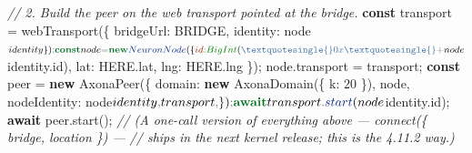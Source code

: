 \documentclass[
  nobib]{tufte-handout}
\newenvironment{Shaded}{}{}
\newcommand{\AttributeTok}[1]{\textcolor[rgb]{0.49,0.56,0.16}{#1}}
\newcommand{\BuiltInTok}[1]{\textcolor[rgb]{0.00,0.50,0.00}{#1}}
\newcommand{\CommentTok}[1]{\textcolor[rgb]{0.38,0.63,0.69}{\textit{#1}}}
\newcommand{\ControlFlowTok}[1]{\textcolor[rgb]{0.00,0.44,0.13}{\textbf{#1}}}
\newcommand{\DataTypeTok}[1]{\textcolor[rgb]{0.56,0.13,0.00}{#1}}
\newcommand{\DecValTok}[1]{\textcolor[rgb]{0.25,0.63,0.44}{#1}}
\newcommand{\FunctionTok}[1]{\textcolor[rgb]{0.02,0.16,0.49}{#1}}
\newcommand{\KeywordTok}[1]{\textcolor[rgb]{0.00,0.44,0.13}{\textbf{#1}}}
\newcommand{\NormalTok}[1]{#1}
\newcommand{\OperatorTok}[1]{\textcolor[rgb]{0.40,0.40,0.40}{#1}}
\newcommand{\StringTok}[1]{\textcolor[rgb]{0.25,0.44,0.63}{#1}}
\begin{document}
\begin{Shaded}
\begin{Highlighting}[]
\CommentTok{// 2. Build the peer on the web transport pointed at the bridge.}
\KeywordTok{const}\NormalTok{ transport }\OperatorTok{=} \FunctionTok{webTransport}\NormalTok{(\{ }\DataTypeTok{bridgeUrl}\OperatorTok{:}\NormalTok{ BRIDGE}\OperatorTok{,} \DataTypeTok{identity}\OperatorTok{:}\NormalTok{ node$identity \})}\OperatorTok{;}
\KeywordTok{const}\NormalTok{ node      }\OperatorTok{=} \KeywordTok{new} \FunctionTok{NeuronNode}\NormalTok{(\{ }\DataTypeTok{id}\OperatorTok{:} \BuiltInTok{BigInt}\NormalTok{(}\StringTok{\textquotesingle{}0x\textquotesingle{}} \OperatorTok{+}\NormalTok{ node$identity}\OperatorTok{.}\AttributeTok{id}\NormalTok{)}\OperatorTok{,} \DataTypeTok{lat}\OperatorTok{:}\NormalTok{ HERE}\OperatorTok{.}\AttributeTok{lat}\OperatorTok{,} \DataTypeTok{lng}\OperatorTok{:}\NormalTok{ HERE}\OperatorTok{.}\AttributeTok{lng}\NormalTok{ \})}\OperatorTok{;}
\NormalTok{node}\OperatorTok{.}\AttributeTok{transport}  \OperatorTok{=}\NormalTok{ transport}\OperatorTok{;}
\KeywordTok{const}\NormalTok{ peer }\OperatorTok{=} \KeywordTok{new} \FunctionTok{AxonaPeer}\NormalTok{(\{}
  \DataTypeTok{domain}\OperatorTok{:} \KeywordTok{new} \FunctionTok{AxonaDomain}\NormalTok{(\{ }\DataTypeTok{k}\OperatorTok{:} \DecValTok{20}\NormalTok{ \})}\OperatorTok{,}
\NormalTok{  node}\OperatorTok{,}
  \DataTypeTok{nodeIdentity}\OperatorTok{:}\NormalTok{ node$identity}\OperatorTok{,}
\NormalTok{  transport}\OperatorTok{,}
\NormalTok{\})}\OperatorTok{;}

\ControlFlowTok{await}\NormalTok{ transport}\OperatorTok{.}\FunctionTok{start}\NormalTok{(node$identity}\OperatorTok{.}\AttributeTok{id}\NormalTok{)}\OperatorTok{;}
\ControlFlowTok{await}\NormalTok{ peer}\OperatorTok{.}\FunctionTok{start}\NormalTok{()}\OperatorTok{;}
\CommentTok{// (A one{-}call version of everything above — \textasciigrave{}connect(\{ bridge, location \})\textasciigrave{} —}
\CommentTok{//  ships in the next kernel release; this is the 4.11.2 way.)}


\end{Highlighting}
\end{Shaded}
\end{document}
